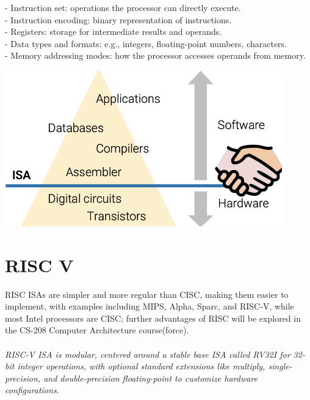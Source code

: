 \documentclass[12pt,openany]{book}
\begin{document}
\begin{minipage}[htp]{0.5\textwidth}

\begin{justify}

- Instruction set: operations the processor can directly execute. \\
- Instruction encoding: binary representation of instructions. \\
- Registers: storage for intermediate results and operands. \\
- Data types and formats: e.g., integers, floating-point numbers, characters. \\
- Memory addressing modes: how the processor accesses operands from memory.

\end{justify}
\end{minipage}
\hfill
\begin{minipage}[htp]{0.35\textwidth}
\begin{center}
	\includegraphics[width=0.9\textwidth]{circuits/19.7.png}
\end{center}
\end{minipage}
\section{RISC V}
RISC ISAs are simpler and more regular than CISC, making them easier to implement, with examples including MIPS, Alpha, Sparc, and RISC-V, while most Intel processors are CISC; further advantages of RISC will be explored in the CS-208 Computer Architecture course(force). \\
\vspace*{3px}\\
\textit{RISC-V ISA is modular, centered around a stable base ISA called RV32I for 32-bit integer operations, with optional standard extensions like multiply, single-precision, and double-precision floating-point to customize hardware configurations.}
\end{document}

